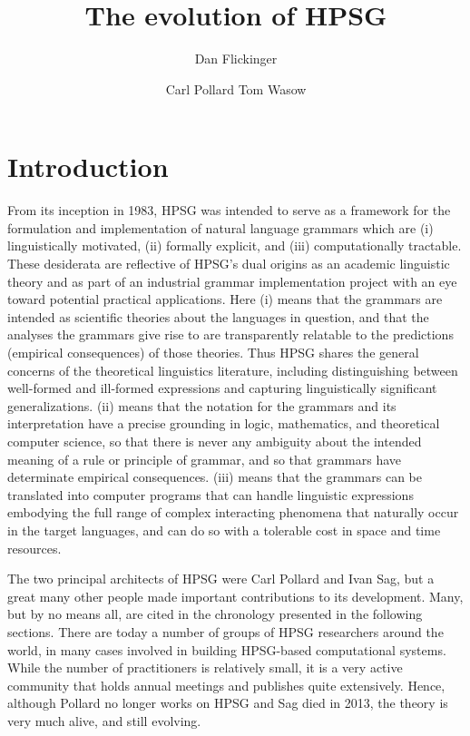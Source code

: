 \documentclass[output=paper
                ,modfonts
                ,nonflat
	        ,collection
	        ,collectionchapter
	        ,collectiontoclongg
 	        ,biblatex
                ,babelshorthands
                ,newtxmath
                ,draftmode
                ,colorlinks, citecolor=brown
]{./langsci/langscibook}
\title{The evolution of HPSG}
\author{%
	Dan Flickinger\affiliation{Stanford University}%
	\and Carl Pollard\affiliation{Ohio State Universitiy}
	\lastand Tom Wasow\affiliation{Stanford University}%
}
\begin{document}
\maketitle
\label{chap-evolution}


\section{Introduction} 

From its inception in 1983, HPSG was intended to serve as a framework for the formulation and implementation of natural language grammars which are (i) linguistically motivated, (ii) formally explicit, and (iii) computationally tractable. These desiderata are reflective of HPSG's dual origins as an academic linguistic theory and as part of an industrial grammar implementation project with an eye toward potential practical applications. Here (i) means that the grammars are intended as scientific theories about the languages in question, and that the analyses the grammars give rise to are transparently relatable to the predictions (empirical consequences) of those theories. Thus HPSG shares the general concerns of the theoretical linguistics literature, including distinguishing between well-formed and ill-formed expressions and capturing linguistically significant generalizations.  (ii) means that the notation for the grammars and its interpretation have a precise grounding in logic, mathematics, and theoretical computer science, so that there is never any ambiguity about the intended meaning of a rule or principle of grammar, and so that grammars have determinate empirical consequences. (iii) means that the grammars can be translated into computer programs that can handle linguistic expressions embodying the full range of complex interacting phenomena that naturally occur in the target languages, and can do so with a tolerable cost in space and time resources.

The two principal architects of HPSG were Carl Pollard and Ivan Sag, but a great many other people made important contributions to its development.  Many, but by no means all, are cited in the chronology presented in the following sections.  There are today a number of groups of HPSG researchers around the world, in many cases involved in building HPSG-based computational systems.  While the number of practitioners is relatively small, it is a very active community that holds annual meetings and publishes quite extensively.  Hence, although Pollard no longer works on HPSG and Sag died in 2013, the theory is very much alive, and still evolving. 
\end{document}
